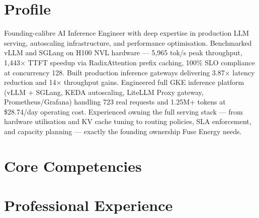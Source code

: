\documentclass[11pt,a4paper]{moderncv}
\begin{document}
\makecvtitle

\section{Profile}
Founding-calibre AI Inference Engineer with deep expertise in production LLM serving, autoscaling infrastructure, and performance optimisation. Benchmarked vLLM and SGLang on H100 NVL hardware — 5,965 tok/s peak throughput, 1,443$\times$ TTFT speedup via RadixAttention prefix caching, 100\% SLO compliance at concurrency 128. Built production inference gateways delivering 3.87$\times$ latency reduction and 14$\times$ throughput gains. Engineered full GKE inference platform (vLLM + SGLang, KEDA autoscaling, LiteLLM Proxy gateway, Prometheus/Grafana) handling 723 real requests and 1.25M+ tokens at \$28.74/day operating cost. Experienced owning the full serving stack — from hardware utilisation and KV cache tuning to routing policies, SLA enforcement, and capacity planning — exactly the founding ownership Fuse Energy needs.

\section{Core Competencies}

\section{Professional Experience}
\end{document}
